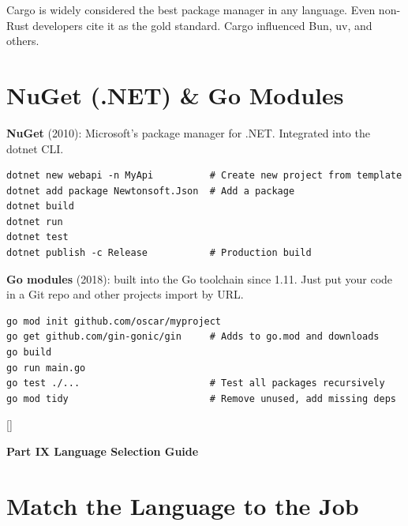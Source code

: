 \documentclass[11pt, letterpaper]{article}
\newcommand{\bluesections}{%
  \titleformat{\section}{\large\bfseries\color{sectionblue}}{}{0em}{}[\color{sectionblue}\titlerule]%
  \titleformat{\subsection}{\normalsize\bfseries\color{sectionblue!80!black}}{}{0em}{}%
}
\newcommand{\partbanner}[3]{%
  \begin{tcolorbox}[colback=#1, colframe=#2, boxrule=1.2pt, arc=4pt,
    left=8pt, right=8pt, top=6pt, bottom=6pt]
    \begin{center}{\LARGE\bfseries #3}\end{center}
  \end{tcolorbox}%
}
\begin{document}
Cargo is widely considered the best package manager in any language. Even non-Rust developers cite it as the gold standard. Cargo influenced Bun, uv, and others.

\section*{NuGet (.NET) \& Go Modules}

\textbf{NuGet} (2010): Microsoft's package manager for .NET. Integrated into the dotnet CLI.

\begin{lstlisting}[style=code, caption={dotnet CLI}]
dotnet new webapi -n MyApi          # Create new project from template
dotnet add package Newtonsoft.Json  # Add a package
dotnet build
dotnet run
dotnet test
dotnet publish -c Release           # Production build
\end{lstlisting}

\textbf{Go modules} (2018): built into the Go toolchain since 1.11. Just put your code in a Git repo and other projects import by URL.

\begin{lstlisting}[style=code, caption={Go modules}]
go mod init github.com/oscar/myproject
go get github.com/gin-gonic/gin     # Adds to go.mod and downloads
go build
go run main.go
go test ./...                       # Test all packages recursively
go mod tidy                         # Remove unused, add missing deps
\end{lstlisting}

\newpage

\bluesections
{}
\partbanner{partbg}{sectionblue}{Part IX \quad Language Selection Guide}

\vspace{8pt}

\section*{Match the Language to the Job}
\end{document}

